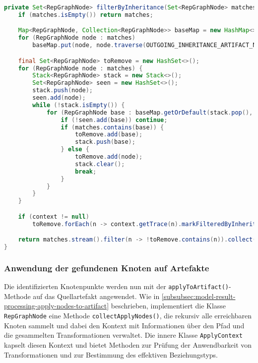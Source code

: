 \begin{lstlisting}[language=Java,caption={Methode \texttt{filterByInheritance}},label=lst:impl-filterByInheritance,basicstyle=\ttfamily\scriptsize]
private Set<RepGraphNode> filterByInheritance(Set<RepGraphNode> matches, RepMatchingContext context) {
    if (matches.isEmpty()) return matches;

    Map<RepGraphNode, Collection<RepGraphNode>> baseMap = new HashMap<>();
    for (RepGraphNode node : matches)
        baseMap.put(node, node.traverse(OUTGOING_INHERITANCE_ARTIFACT_NODE_QUERY).values());

    final Set<RepGraphNode> toRemove = new HashSet<>();
    for (RepGraphNode node : matches) {
        Stack<RepGraphNode> stack = new Stack<>();
        Set<RepGraphNode> seen = new HashSet<>();
        stack.push(node);
        seen.add(node);
        while (!stack.isEmpty()) {
            for (RepGraphNode base : baseMap.getOrDefault(stack.pop(), Collections.emptyList())) {
                if (!seen.add(base)) continue;
                if (matches.contains(base)) {
                    toRemove.add(base);
                    stack.push(base);
                } else {
                    toRemove.add(node);
                    stack.clear();
                    break;
                }
            }
        }
    }

    if (context != null)
        toRemove.forEach(n -> context.getTrace(n).markFilteredByInheritance());

    return matches.stream().filter(n -> !toRemove.contains(n)).collect(Collectors.toSet());
}
\end{lstlisting}

\subsubsection{Anwendung der gefundenen Knoten auf Artefakte}

Die identifizierten Knotenpunkte werden nun mit der \texttt{applyToArtifact()}-Methode auf das Quellartefakt angewendet.
Wie in \autoref{subsubsec:model-result-processing-apply-nodes-to-artifact} beschrieben, implementiert die Klasse \texttt{RepGraphNode} eine Methode \texttt{collectApplyNodes()}, die rekursiv alle erreichbaren Knoten sammelt und dabei den Kontext mit Informationen über den Pfad und die gesammelten Transformationen verwaltet.
Die innere Klasse \texttt{ApplyContext} kapselt diesen Kontext und bietet Methoden zur Prüfung der Anwendbarkeit von Transformationen und zur Bestimmung des effektiven Beziehungstyps.

